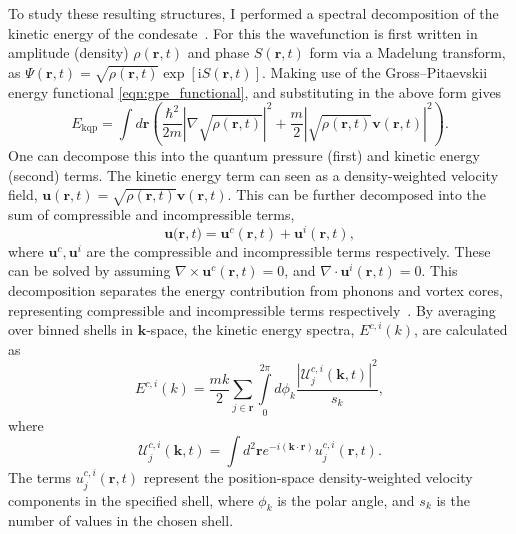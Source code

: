 To study these resulting structures, I performed a spectral decomposition of the kinetic energy of the condesate~\cite{CT:Nore_prl_1997,CT:Nore_pof_1997,CT:Bradley_prx_2012}. For this the wavefunction is first written in amplitude (density) $\rho(\mathbf{r},t)$ and phase $S(\mathbf{r},t)$ form via a Madelung transform, as
$
		\Psi(\mathbf{r},t) = \sqrt{\rho(\mathbf{r},t)}\exp{\left[\mathrm{i}S(\mathbf{r},t)\right]}.
$
Making use of the Gross--Pitaevskii energy functional \ref{eqn:gpe_functional}, and substituting in the above form gives
\begin{equation}
    E_{\text{kqp}} = \int d\mathbf{r} \left( \frac{\hbar^2}{2m}| \nabla\sqrt{\rho(\mathbf{r},t)} |^2  + \frac{m}{2}|\sqrt{\rho(\mathbf{r},t)}\mathbf{v}(\mathbf{r},t) |^2\right).
\end{equation}
One can decompose this into the quantum pressure (first) and kinetic energy (second) terms. The kinetic energy term can seen as a density-weighted velocity field, $\mathbf{u}(\mathbf{r},t) = \sqrt{\rho(\mathbf{r},t)}\mathbf{v}(\mathbf{r},t)$. This can be further decomposed into the sum of compressible and incompressible terms,
\begin{equation}
    \mathbf{u(r},t) = \mathbf{u}^c(\mathbf{r},t) + \mathbf{u}^i(\mathbf{r},t),
\end{equation}
where $\mathbf{u}^c, \mathbf{u}^i$ are the compressible and incompressible terms respectively. These can be solved by assuming $\nabla \times \mathbf{u}^c(\mathbf{r},t) = 0$, and $\nabla \cdot \mathbf{u}^i(\mathbf{r},t) = 0$. This decomposition separates the energy contribution from phonons and vortex cores, representing compressible and incompressible terms respectively~\cite{CT:Horng_pra_2009}. By averaging over binned shells in $\mathbf{k}$-space, the kinetic energy spectra, $E^{c,i}(k)$, are calculated as~\cite{CT:Bradley_prx_2012}
\begin{equation}
	E^{c,i}(k) = \frac{mk}{2}\sum\limits_{j\in\mathbf{r}} \int\limits_{0}^{2\pi}d\phi_k \frac{ |\mathcal{U}_j^{c,i}(\mathbf{k},t) |^2}{s_k},
\end{equation}
where
\begin{equation}
	\mathcal{U}_j^{c,i}(\mathbf{k},t) = \int d^2 \mathbf{r} e^{-i(\mathbf{k}\cdot\mathbf{r})} u_j^{c,i}(\mathbf{r},t).
\end{equation}
The terms $u_j^{c,i}(\mathbf{r},t)$ represent the position-space density-weighted velocity components in the specified shell, where $\phi_k$ is the polar angle, and $s_k$ is the number of values in the chosen shell.

